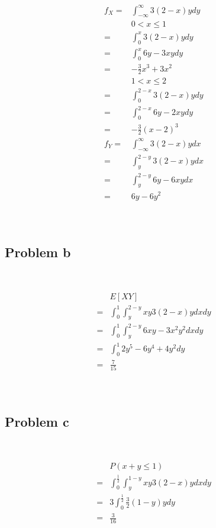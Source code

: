 \documentclass{article}
\begin{document}
\begin{equation*}
    \begin{split}
        f_X=&\int_{-\infty}^{\infty}3(2-x)ydy\\
        &0<x\leqslant1\\
        =&\int_{0}^{x}3(2-x)ydy\\
        =&\int_{0}^{x}6y-3xydy\\
        =&-\frac{3}{2}x^3+3x^2\\
        &1<x\leqslant2\\
        =&\int_{0}^{2-x}3(2-x)ydy\\
        =&\int_{0}^{2-x}6y-2xydy\\
        =&-\frac{3}{2}(x-2)^3\\
        f_Y=&\int_{-\infty}^{\infty}3(2-x)ydx\\
        =&\int_{y}^{2-y}3(2-x)ydx\\
        =&\int_{y}^{2-y}6y-6xydx\\
        =&6y-6y^2\\
    \end{split}
\end{equation*}

~

\subsection*{Problem b}

~

\begin{equation*}
    \begin{split}
        &E[XY]\\
        =&\int_{0}^{1}\int_{y}^{2-y}xy3(2-x)ydxdy\\
        =&\int_{0}^{1}\int_{y}^{2-y}6xy-3x^2y^2dxdy\\
        =&\int_{0}^{1}2y^5-6y^4+4y^2dy\\
        =&\frac{7}{15}\\
    \end{split}
\end{equation*}

~

\subsection*{Problem c}

~

\begin{equation*}
    \begin{split}
        &P(x+y\leqslant1)\\
        =&\int_{0}^{\frac{1}{2}}\int_{y}^{1-y}xy3(2-x)ydxdy\\
        =&3\int_{0}^{\frac{1}{2}}\frac{3}{2}(1-y)ydy\\
        =&\frac{3}{16}\\
    \end{split}
\end{equation*}
\end{document}
